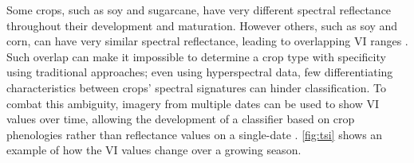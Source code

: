 Some crops, such as soy and sugarcane, have very different spectral reflectance throughout their development and maturation. However others, such as soy and corn, can have very similar spectral reflectance, leading to overlapping VI ranges \autocite{price1994how-unique}. Such overlap can make it impossible to determine a crop type with specificity using traditional approaches; even using hyperspectral data, few differentiating characteristics between crops' spectral signatures can hinder classification. To combat this ambiguity, imagery from multiple dates can be used to show VI values over time, allowing the development of a classifier based on crop phenologies rather than reflectance values on a single-date \autocites{gu2010phenological}{wardlow2002discriminating}{wardlow2005state-level}{wardlow2007analysis}{wardlow2008large-area}{zhang2003monitoring}. \autoref{fig:tsi} shows an example of how the VI values change over a growing season.

